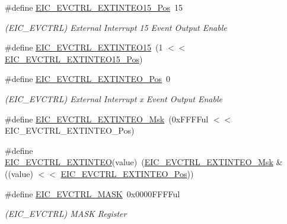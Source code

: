 \begin{DoxyCompactItemize}
\item 
\#define \mbox{\hyperlink{group___s_a_m_d21___e_i_c_ga0b1418a8ed08d831ea2f69483673a77a}{E\+I\+C\+\_\+\+E\+V\+C\+T\+R\+L\+\_\+\+E\+X\+T\+I\+N\+T\+E\+O15\+\_\+\+Pos}}~15
\begin{DoxyCompactList}\small\item\em (E\+I\+C\+\_\+\+E\+V\+C\+T\+RL) External Interrupt 15 Event Output Enable \end{DoxyCompactList}\item 
\#define \mbox{\hyperlink{group___s_a_m_d21___e_i_c_ga53abbbc4306a06419ed0c71f86509362}{E\+I\+C\+\_\+\+E\+V\+C\+T\+R\+L\+\_\+\+E\+X\+T\+I\+N\+T\+E\+O15}}~(1 $<$$<$ \mbox{\hyperlink{group___s_a_m_d21___e_i_c_ga0b1418a8ed08d831ea2f69483673a77a}{E\+I\+C\+\_\+\+E\+V\+C\+T\+R\+L\+\_\+\+E\+X\+T\+I\+N\+T\+E\+O15\+\_\+\+Pos}})
\item 
\#define \mbox{\hyperlink{group___s_a_m_d21___e_i_c_gaed4eb850843b4dea239dd997ae81008a}{E\+I\+C\+\_\+\+E\+V\+C\+T\+R\+L\+\_\+\+E\+X\+T\+I\+N\+T\+E\+O\+\_\+\+Pos}}~0
\begin{DoxyCompactList}\small\item\em (E\+I\+C\+\_\+\+E\+V\+C\+T\+RL) External Interrupt x Event Output Enable \end{DoxyCompactList}\item 
\#define \mbox{\hyperlink{group___s_a_m_d21___e_i_c_ga941107dea5516bf17998a0012bee9e7d}{E\+I\+C\+\_\+\+E\+V\+C\+T\+R\+L\+\_\+\+E\+X\+T\+I\+N\+T\+E\+O\+\_\+\+Msk}}~(0x\+F\+F\+F\+Ful $<$$<$ E\+I\+C\+\_\+\+E\+V\+C\+T\+R\+L\+\_\+\+E\+X\+T\+I\+N\+T\+E\+O\+\_\+\+Pos)
\item 
\#define \mbox{\hyperlink{group___s_a_m_d21___e_i_c_ga6644ed2806b2b22764ccdb89aa74c945}{E\+I\+C\+\_\+\+E\+V\+C\+T\+R\+L\+\_\+\+E\+X\+T\+I\+N\+T\+EO}}(value)~(\mbox{\hyperlink{group___s_a_m_d21___e_i_c_ga941107dea5516bf17998a0012bee9e7d}{E\+I\+C\+\_\+\+E\+V\+C\+T\+R\+L\+\_\+\+E\+X\+T\+I\+N\+T\+E\+O\+\_\+\+Msk}} \& ((value) $<$$<$ \mbox{\hyperlink{group___s_a_m_d21___e_i_c_gaed4eb850843b4dea239dd997ae81008a}{E\+I\+C\+\_\+\+E\+V\+C\+T\+R\+L\+\_\+\+E\+X\+T\+I\+N\+T\+E\+O\+\_\+\+Pos}}))
\item 
\#define \mbox{\hyperlink{group___s_a_m_d21___e_i_c_ga613f01075fe9c2dd9dcc34c5dacfd6ed}{E\+I\+C\+\_\+\+E\+V\+C\+T\+R\+L\+\_\+\+M\+A\+SK}}~0x0000\+F\+F\+F\+Ful
\begin{DoxyCompactList}\small\item\em (E\+I\+C\+\_\+\+E\+V\+C\+T\+RL) M\+A\+SK Register \end{DoxyCompactList}\item 
$$
\end{DoxyCompactItemize}
